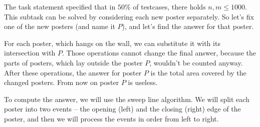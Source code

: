 \usetikzlibrary{decorations.pathreplacing}




The task statement specified that in $50\%$ of testcases,
	there holds $n, m \le 1000$.
This subtask can be solved by considering each new poster separately.
So let's fix one of the new posters (and name it $P$), and let's find the answer for that poster.

For each poster, which hangs on the wall, we can substitute it with its intersection with $P$.
Those operations cannot change the final answer, because the parts of posters,
	which lay outside the poster $P$, wouldn't be counted anyway.
After these operations, the answer for poster $P$ is the total area
	covered by the changed posters.
From now on poster $P$ is useless.

To compute the answer, we will use the sweep line algorithm.
We will split each poster into two events -- the opening (left) and the closing (right) edge of the poster,
	and then we will process the events in order from left to right.

